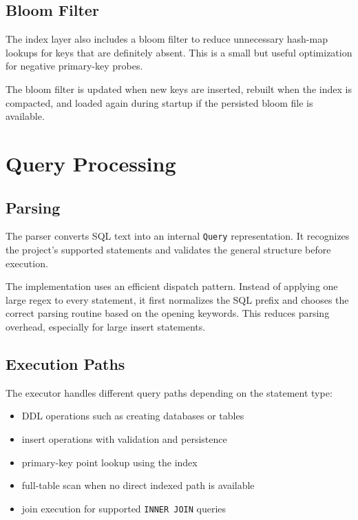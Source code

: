 \documentclass[12pt,a4paper]{article}
\begin{document}
\subsection{Bloom Filter}

The index layer also includes a bloom filter to reduce unnecessary hash-map
lookups for keys that are definitely absent. This is a small but useful
optimization for negative primary-key probes.

The bloom filter is updated when new keys are inserted, rebuilt when the index
is compacted, and loaded again during startup if the persisted bloom file is
available.

\section{Query Processing}

\subsection{Parsing}

The parser converts SQL text into an internal \texttt{Query} representation.
It recognizes the project's supported statements and validates the general
structure before execution.

The implementation uses an efficient dispatch pattern. Instead of applying one
large regex to every statement, it first normalizes the SQL prefix and chooses
the correct parsing routine based on the opening keywords. This reduces parsing
overhead, especially for large insert statements.

\subsection{Execution Paths}

The executor handles different query paths depending on the statement type:

\begin{itemize}[leftmargin=1.8em]
  \item DDL operations such as creating databases or tables
  \item insert operations with validation and persistence
  \item primary-key point lookup using the index
  \item full-table scan when no direct indexed path is available
  \item join execution for supported \texttt{INNER JOIN} queries
\end{itemize}
\end{document}
